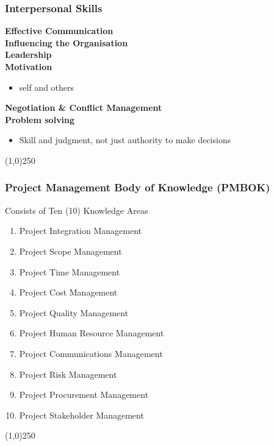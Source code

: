 \begin{frame}
\frametitle{Interpersonal Skills}
\textbf{Effective Communication}\\
\textbf{Influencing the Organisation}\\
\textbf{Leadership}\\
\textbf{Motivation}  \\
\begin{itemize}
	\item self and others
\end{itemize}
\textbf{Negotiation \& Conflict Management}\\
\textbf{Problem solving} \\
\begin{itemize}
	\item Skill and judgment, not just authority to make decisions 
\end{itemize}
\end{frame}
\begin{center}\line(1,0){250}\end{center}



\begin{frame}
\frametitle{Project Management Body of Knowledge (PMBOK\textregistered)}
Consists of Ten (10) Knowledge Areas
\begin{enumerate}
\item Project Integration Management
\item Project Scope Management
\item Project Time Management
\item Project Cost Management
\item Project Quality Management
\item Project Human Resource Management
\item Project Communications Management
\item Project Risk Management
\item Project Procurement Management
\item Project Stakeholder Management
\end{enumerate}
\end{frame}
\begin{center}\line(1,0){250}\end{center}





